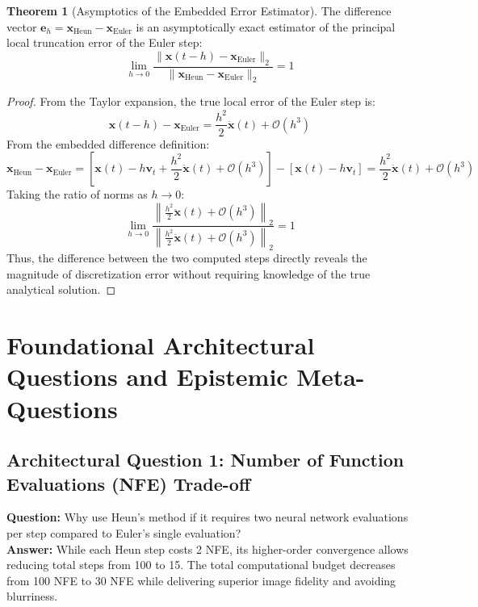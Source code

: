\documentclass[11pt,a4paper]{article}
\theoremstyle{definition}
\newtheorem{theorem}{\textbf{Theorem}}[section]
\begin{document}
\begin{theorem}[Asymptotics of the Embedded Error Estimator]
The difference vector $\mathbf{e}_h = \mathbf{x}_{\text{Heun}} - \mathbf{x}_{\text{Euler}}$ is an asymptotically exact estimator of the principal local truncation error of the Euler step:
{\boldmath
\begin{equation}
\lim_{h \to 0} \frac{\|\mathbf{x}(t - h) - \mathbf{x}_{\text{Euler}}\|_2}{\|\mathbf{x}_{\text{Heun}} - \mathbf{x}_{\text{Euler}}\|_2} = 1
\end{equation}
}
\end{theorem}

\begin{proof}
From the Taylor expansion, the true local error of the Euler step is:
{\boldmath
\begin{equation}
\mathbf{x}(t - h) - \mathbf{x}_{\text{Euler}} = \frac{h^2}{2} \ddot{\mathbf{x}}(t) + \mathcal{O}(h^3)
\end{equation}
}
From the embedded difference definition:
{\boldmath
\begin{equation}
\mathbf{x}_{\text{Heun}} - \mathbf{x}_{\text{Euler}} = \left[ \mathbf{x}(t) - h\mathbf{v}_t + \frac{h^2}{2}\ddot{\mathbf{x}}(t) + \mathcal{O}(h^3) \right] - \left[ \mathbf{x}(t) - h\mathbf{v}_t \right] = \frac{h^2}{2}\ddot{\mathbf{x}}(t) + \mathcal{O}(h^3)
\end{equation}
}
Taking the ratio of norms as $h \to 0$:
{\boldmath
\begin{equation}
\lim_{h \to 0} \frac{\left\|\frac{h^2}{2}\ddot{\mathbf{x}}(t) + \mathcal{O}(h^3)\right\|_2}{\left\|\frac{h^2}{2}\ddot{\mathbf{x}}(t) + \mathcal{O}(h^3)\right\|_2} = 1
\end{equation}
}
Thus, the difference between the two computed steps directly reveals the magnitude of discretization error without requiring knowledge of the true analytical solution.
\end{proof}

\section{Foundational Architectural Questions and Epistemic Meta-Questions}

\subsection{Architectural Question 1: Number of Function Evaluations (NFE) Trade-off}
\textbf{Question:} Why use Heun's method if it requires two neural network evaluations per step compared to Euler's single evaluation?\\
\textbf{Answer:} While each Heun step costs 2 NFE, its higher-order convergence allows reducing total steps from 100 to 15. The total computational budget decreases from 100 NFE to 30 NFE while delivering superior image fidelity and avoiding blurriness.
\end{document}
